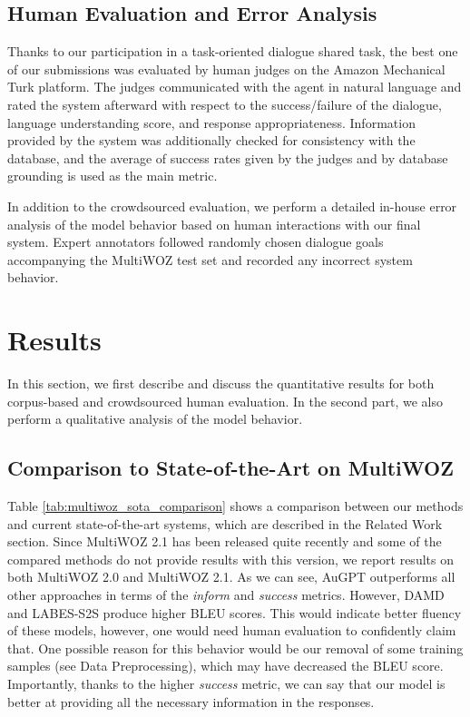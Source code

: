 \documentclass[11pt,a4paper]{article}
\newcommand{\multiwoz}[0]{MultiWOZ 2.0\xspace}
\newcommand{\multiwozn}[0]{MultiWOZ 2.1\xspace}
\newcommand{\augpt}[0]{AuGPT\xspace}
\begin{document}
\subsection{Human Evaluation and Error Analysis}

Thanks to our participation in a task-oriented dialogue shared task, the best one of our submissions was evaluated by human judges on the Amazon Mechanical Turk platform. The judges communicated with the agent in natural language and rated the system afterward with respect to the success/failure of the dialogue, language understanding score, and response appropriateness. Information provided by the system was additionally checked for consistency with the database, and the average of success rates given by the judges and by database grounding is used as the main metric.


In addition to the crowdsourced evaluation, we perform a detailed in-house error analysis of the model behavior based on human interactions with our final system. Expert annotators followed randomly chosen dialogue goals accompanying the MultiWOZ test set and recorded any incorrect system behavior.


\section{Results}
\label{sec:results}

In this section, we first describe and discuss the quantitative results for both corpus-based and crowdsourced human evaluation.
In the second part, we also perform a qualitative analysis of the model behavior.

\subsection{Comparison to State-of-the-Art on MultiWOZ}

Table \ref{tab:multiwoz_sota_comparison} shows a comparison between our methods and current state-of-the-art systems, which are described in the Related Work section.
Since \multiwozn has been released quite recently and some of the compared methods do not provide results with this version, we report results on both \multiwoz and MultiWOZ 2.1.
As we can see, \augpt outperforms all other approaches in terms of the \emph{inform} and \emph{success} metrics. However, DAMD and LABES-S2S produce higher BLEU scores.
This would indicate better fluency of these models, however, one would need human evaluation to confidently claim that.
One possible reason for this behavior would be our removal of some training samples (see Data Preprocessing), which may have decreased the BLEU score.
Importantly, thanks to the higher \emph{success} metric, we can say that our model is better at providing all the necessary information in the responses.
\end{document}
